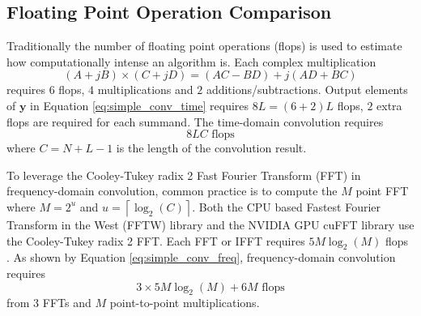 \subsection{Floating Point Operation Comparison}
Traditionally the number of floating point operations (flops) is used to estimate how computationally intense an algorithm is. 
Each complex multiplication  
\begin{equation}
(A+jB)\times(C+jD) = (AC-BD)+j(AD+BC)
\end{equation}
requires $6$ flops, $4$ multiplications and $2$ additions/subtractions.
Output elements of $\mathbf{y}$ in Equation \eqref{eq:simple_conv_time} requires $8L = (6+2)L$ flops, $2$ extra flops are required for each summand.
The time-domain convolution requires
\begin{equation}
8LC \text{ flops}
\label{eq:flops_time_domain_conv}
\end{equation}
where $C=N+L-1$ is the length of the convolution result.

To leverage the Cooley-Tukey radix 2 Fast Fourier Transform (FFT) in frequency-domain convolution, common practice is to compute the $M$ point FFT where $M = 2^u$ and $u = {\left\lceil \log_2{\left(C\right)}  \right\rceil}$.
Both the CPU based Fastest Fourier Transform in the West (FFTW) library and the NVIDIA GPU cuFFT library use the Cooley-Tukey radix 2 FFT.
Each FFT or IFFT requires $5M\log_2(M)$ flops \cite{FFTW:2017,cooley1965algorithm}.
As shown by Equation \eqref{eq:simple_conv_freq}, frequency-domain convolution requires 
\begin{equation}
3\times5M\log_2(M)+6M \text{ flops}
\label{eq:flops_freq_domain_conv}
\end{equation}
from $3$ FFTs and $M$ point-to-point multiplications.

